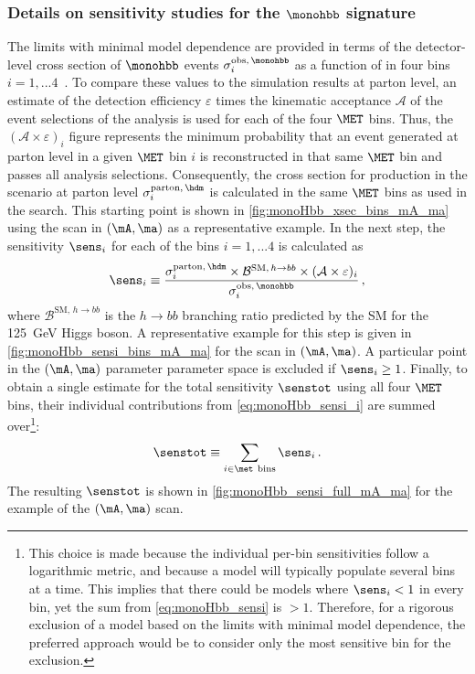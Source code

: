 \subsubsection{Details on sensitivity studies for the $\monohbb$ signature}
\label{sec:sensi_monohbb_app}

The limits with minimal model dependence are provided in terms of the detector-level cross section of $\monohbb$ events $\sigma_{i}^{\mathrm{obs},\,\monohbb}$ as a function of \met in four bins $i=1,...4$~\cite{Aaboud:2017yqz}. 
To compare these values to the simulation results at parton level, 
an estimate of the detection efficiency $\varepsilon$ times the kinematic acceptance $\mathcal{A}$ of the event selections of the analysis is used for each of the four $\MET$ bins.
Thus, the $(\mathcal{A}\times\varepsilon)_i$ figure represents the minimum probability
that an event generated at parton level in a given $\MET$ bin $i$ is reconstructed in that same $\MET$ bin and passes all analysis selections.
Consequently, the cross section for \hdm production in the \hdma scenario at parton level $\sigma_{i}^{\mathrm{parton},\,\hdm}$ is calculated in the same $\MET$ bins as used in the \monohbb search. This starting point is shown in \autoref{fig:monoHbb_xsec_bins_mA_ma} using the scan in $(\mA,\ma)$ as a representative example. 
In the next step, the sensitivity $\sens_i$ for each of the \met bins $i=1,...4$ is calculated as
\begin{equation}
\label{eq:monoHbb_sensi_i}
\sens_i \equiv \frac{\sigma_{i}^{\mathrm{parton},\,\hdm} \times \mathcal{B}^{\mathrm{SM},\,h\to bb} \times (\mathcal{A\times\varepsilon})_{i} }
{\sigma_{i}^{\mathrm{obs},\,\monohbb}}\,,
\end{equation}
where $\mathcal{B}^{\mathrm{SM},\,h\to bb}$ is the $h\to bb$ branching ratio predicted by the SM for the 125~GeV Higgs boson. A representative example for this step is given in \autoref{fig:monoHbb_sensi_bins_mA_ma} for the scan in $(\mA,\ma)$.  A particular point in the $(\mA,\ma)$ parameter parameter space is excluded if $\sens_i \geq 1$. Finally, to obtain a single estimate for the total sensitivity $\senstot$ using all four $\MET$ bins, their individual contributions from \autoref{eq:monoHbb_sensi_i} are summed over\footnote{
This choice is made because the individual per-bin sensitivities follow a logarithmic metric, and because a model will typically populate several \met bins at a time. This implies that there could be models where $\sens_i<1$ in every bin, yet the sum from \autoref{eq:monoHbb_sensi} is $>1$.
Therefore, for a rigorous exclusion of a model based on the limits with minimal model dependence, the preferred approach would be to consider only the most sensitive bin for the exclusion.
}:
\begin{equation}
\label{eq:monoHbb_sensi}
\senstot \equiv \sum_{i\in\met~\mathrm{bins}} \sens_i\,.
\end{equation}
The resulting $\senstot$ is shown in \autoref{fig:monoHbb_sensi_full_mA_ma} for the example of the $(\mA,\ma)$ scan.